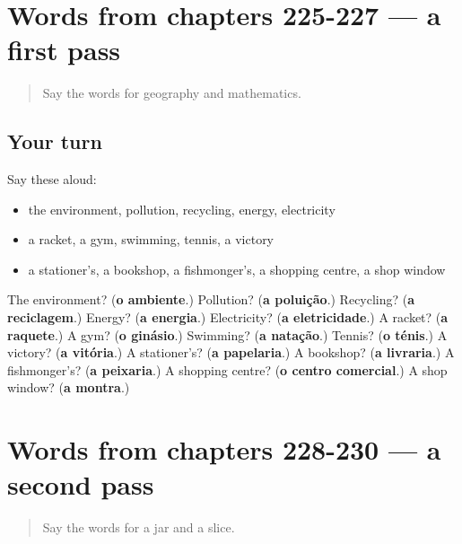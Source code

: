 \section[(dialogue)]{Words from chapters 225-227 — a first pass}

\label{lesson:PT-R230-first-pass-words-from-chapters-225-227}



\begin{quote}
Say the words for geography and mathematics.
\end{quote}

\subsection*{Your turn}
Say these aloud:

\begin{itemize}
\raggedright
  \item the environment, pollution, recycling, energy, electricity
  \item a racket, a gym, swimming, tennis, a victory
  \item a stationer's, a bookshop, a fishmonger's, a shopping centre, a shop window
\end{itemize}

\begin{tcolorbox}[breakable,colback=teal!4,colframe=teal!35!black,title={Before you move on}]
The environment? (\textbf{o ambiente}.) Pollution? (\textbf{a poluição}.) Recycling? (\textbf{a reciclagem}.) Energy? (\textbf{a energia}.) Electricity? (\textbf{a eletricidade}.) A racket? (\textbf{a raquete}.) A gym? (\textbf{o ginásio}.) Swimming? (\textbf{a natação}.) Tennis? (\textbf{o ténis}.) A victory? (\textbf{a vitória}.) A stationer's? (\textbf{a papelaria}.) A bookshop? (\textbf{a livraria}.) A fishmonger's? (\textbf{a peixaria}.) A shopping centre? (\textbf{o centro comercial}.) A shop window? (\textbf{a montra}.)
\end{tcolorbox}
\section[(dialogue)]{Words from chapters 228-230 — a second pass}

\label{lesson:PT-R230-second-pass-words-from-chapters-228-230}



\begin{quote}
Say the words for a jar and a slice.
\end{quote}

